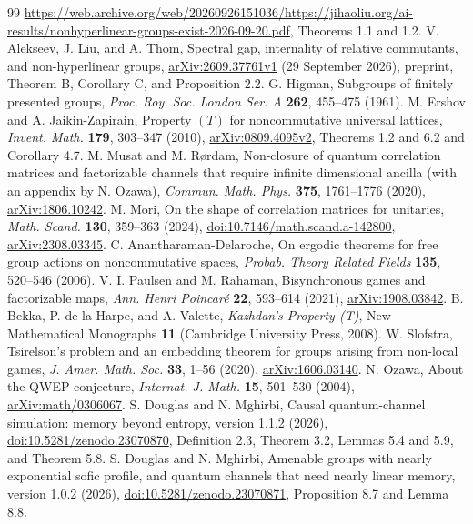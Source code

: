 \begin{thebibliography}{99}
\url{https://web.archive.org/web/20260926151036/https://jihaoliu.org/ai-results/nonhyperlinear-groups-exist-2026-09-20.pdf},
Theorems 1.1 and 1.2.
V. Alekseev, J. Liu, and A. Thom, Spectral gap, internality of relative commutants, and
non-hyperlinear groups, \href{https://arxiv.org/abs/2609.37761v1}{arXiv:2609.37761v1}
(29 September 2026), preprint, Theorem B, Corollary C, and Proposition 2.2.
G. Higman, Subgroups of finitely presented groups, \emph{Proc. Roy. Soc. London Ser. A}
\textbf{262}, 455--475 (1961).
M. Ershov and A. Jaikin-Zapirain, Property $(T)$ for noncommutative universal lattices,
\emph{Invent. Math.} \textbf{179}, 303--347 (2010),
\href{https://arxiv.org/abs/0809.4095v2}{arXiv:0809.4095v2}, Theorems 1.2 and 6.2 and Corollary 4.7.
M. Musat and M. R\o rdam, Non-closure of quantum correlation matrices and factorizable
channels that require infinite dimensional ancilla (with an appendix by N. Ozawa),
\emph{Commun. Math. Phys.} \textbf{375},
1761--1776 (2020), \href{https://arxiv.org/abs/1806.10242}{arXiv:1806.10242}.
M. Mori, On the shape of correlation matrices for unitaries, \emph{Math. Scand.}
\textbf{130}, 359--363 (2024), \href{https://doi.org/10.7146/math.scand.a-142800}{doi:10.7146/math.scand.a-142800},
\href{https://arxiv.org/abs/2308.03345}{arXiv:2308.03345}.
C. Anantharaman-Delaroche, On ergodic theorems for free group actions on noncommutative spaces,
\emph{Probab. Theory Related Fields} \textbf{135}, 520--546 (2006).
V. I. Paulsen and M. Rahaman, Bisynchronous games and factorizable maps,
\emph{Ann. Henri Poincar\'e} \textbf{22}, 593--614 (2021),
\href{https://arxiv.org/abs/1908.03842}{arXiv:1908.03842}.
B. Bekka, P. de la Harpe, and A. Valette, \emph{Kazhdan's Property (T)}, New Mathematical
Monographs \textbf{11} (Cambridge University Press, 2008).
W. Slofstra, Tsirelson's problem and an embedding theorem for groups arising from non-local
games, \emph{J. Amer. Math. Soc.} \textbf{33}, 1--56 (2020),
\href{https://arxiv.org/abs/1606.03140}{arXiv:1606.03140}.
N. Ozawa, About the QWEP conjecture, \emph{Internat. J. Math.} \textbf{15}, 501--530 (2004),
\href{https://arxiv.org/abs/math/0306067}{arXiv:math/0306067}.
S. Douglas and N. Mghirbi, Causal quantum-channel simulation: memory beyond entropy,
version 1.1.2 (2026), \href{https://doi.org/10.5281/zenodo.23070870}{doi:10.5281/zenodo.23070870},
Definition 2.3, Theorem 3.2, Lemmas 5.4 and 5.9, and Theorem 5.8.
S. Douglas and N. Mghirbi, Amenable groups with nearly exponential sofic profile, and quantum
channels that need nearly linear memory, version 1.0.2 (2026),
\href{https://doi.org/10.5281/zenodo.23070871}{doi:10.5281/zenodo.23070871},
Proposition 8.7 and Lemma 8.8.
\end{thebibliography}
